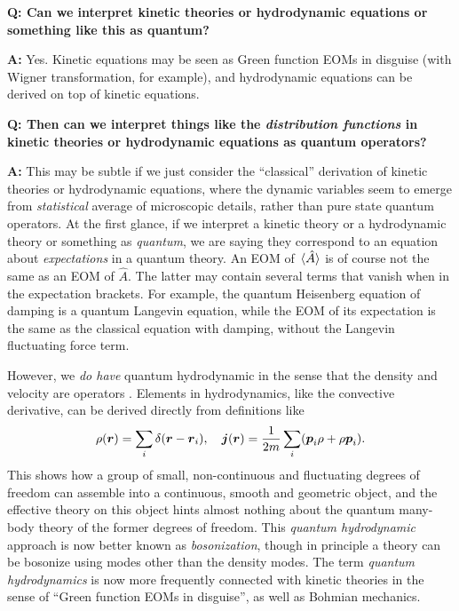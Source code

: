 \documentclass[hyperref, a4paper]{article}
\newenvironment{qanda}{\setlength{\parindent}{0pt}}{\bigskip}
\newcommand{\Q}{\bigskip\bfseries Q: }
\newcommand{\A}{\par\textbf{A:} \normalfont}
\begin{document}
\begin{qanda}

\Q Can we interpret kinetic theories or hydrodynamic equations or something like this as quantum?  
\A Yes. Kinetic equations may be seen as Green function EOMs in disguise (with Wigner transformation, 
for example), and hydrodynamic equations can be derived on top of kinetic equations.

\Q Then can we interpret things like the \emph{distribution functions} in kinetic theories or hydrodynamic equations 
as quantum operators?
\A This may be subtle if we just consider the ``classical'' derivation of kinetic theories or 
hydrodynamic equations, where the dynamic variables seem to emerge from \emph{statistical} average 
of microscopic details, rather than pure state quantum operators. At the first glance, if we interpret
a kinetic theory or a hydrodynamic theory or something as \emph{quantum}, we are saying they correspond 
to an equation about \emph{expectations} in a quantum theory. An EOM of $\expval*{\hat{A}}$ is of course 
not the same as an EOM of $\hat{A}$. The latter may contain several terms that vanish when in the expectation 
brackets. For example, the quantum Heisenberg equation of damping is a quantum Langevin equation, while the 
EOM of its expectation is the same as the classical equation with damping, without the Langevin fluctuating 
force term.

However, we \emph{do have} quantum hydrodynamic in the sense that the density and velocity are operators \cite{Penrose1954-zv}. Elements in hydrodynamics, like the convective derivative,
can be derived directly from definitions like 
\begin{equation}
    \rho(\vb*{r}) = \sum_i \delta(\vb*{r} - \vb*{r}_i), \quad 
    \vb*{j}(\vb*{r}) = \frac{1}{2m} \sum_i (\vb*{p}_i \rho + \rho \vb*{p}_i).
\end{equation} 
This shows how a group of small, non-continuous and fluctuating degrees of freedom can assemble into 
a continuous, smooth and geometric object, and the effective theory on this object hints almost nothing 
about the quantum many-body theory of the former degrees of freedom. This \emph{quantum hydrodynamic}
approach is now better known as \emph{bosonization}, though in principle a theory can be bosonize using 
modes other than the density modes. The term \emph{quantum hydrodynamics} is now more frequently connected
with kinetic theories in the sense of ``Green function EOMs in disguise'', as well as Bohmian mechanics.


\end{qanda}
\end{document}
